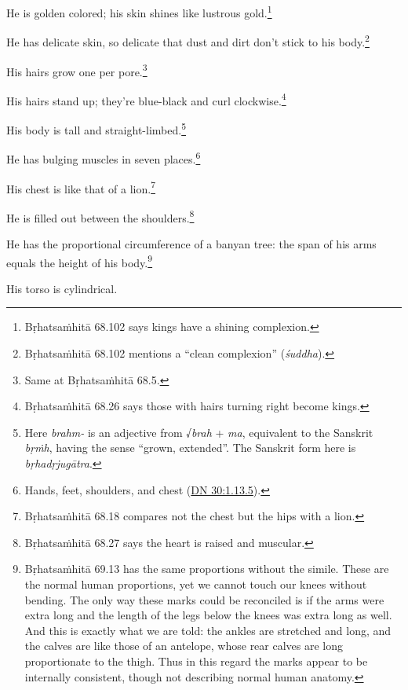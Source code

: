 \documentclass[12pt,openany]{book}%
\begin{document}
He is golden colored; his skin shines like lustrous gold.\footnote{\textsanskrit{Bṛhatsaṁhitā} 68.102 says kings have a shining complexion. } 

He has delicate skin, so delicate that dust and dirt don’t stick to his body.\footnote{\textsanskrit{Bṛhatsaṁhitā} 68.102 mentions a “clean complexion” (\textit{\textsanskrit{śuddha}}). } 

His hairs grow one per pore.\footnote{Same at \textsanskrit{Bṛhatsaṁhitā} 68.5. } 

His hairs stand up; they’re blue-black and curl clockwise.\footnote{\textsanskrit{Bṛhatsaṁhitā} 68.26 says those with hairs turning right become kings. } 

His body is tall and straight-limbed.\footnote{Here \textit{brahm-} is an adjective from √\textit{brah} + \textit{ma}, equivalent to the Sanskrit \textit{\textsanskrit{bṛṁh}}, having the sense “grown, extended”. The Sanskrit form here is \textit{\textsanskrit{bṛhadṛjugātra}}. } 

He has bulging muscles in seven places.\footnote{Hands, feet, shoulders, and chest (\href{https://suttacentral.net/dn30/en/sujato\#1.13.5}{DN 30:1.13.5}). } 

His chest is like that of a lion.\footnote{\textsanskrit{Bṛhatsaṁhitā} 68.18 compares not the chest but the hips with a lion. } 

He is filled out between the shoulders.\footnote{\textsanskrit{Bṛhatsaṁhitā} 68.27 says the heart is raised and muscular. } 

He has the proportional circumference of a banyan tree: the span of his arms equals the height of his body.\footnote{\textsanskrit{Bṛhatsaṁhitā} 69.13 has the same proportions without the simile. These are the normal human proportions, yet we cannot touch our knees without bending. The only way these marks could be reconciled is if the arms were extra long and the length of the legs below the knees was extra long as well. And this is exactly what we are told: the ankles are stretched and long, and the calves are like those of an antelope, whose rear calves are long proportionate to the thigh. Thus in this regard the marks appear to be internally consistent, though not describing normal human anatomy. } 

His torso is cylindrical. 
\end{document}
